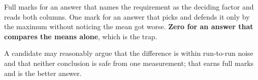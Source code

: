 Full marks for an answer that names the requirement as the deciding factor and reads both columns.
One mark for an answer that picks  and defends it only by the maximum without
noticing the mean got worse. \textbf{Zero for an answer that compares the means alone}, which is the
trap.

A candidate may reasonably argue that the difference is within run-to-run noise and that neither
conclusion is safe from one measurement; that earns full marks and is the better answer.

